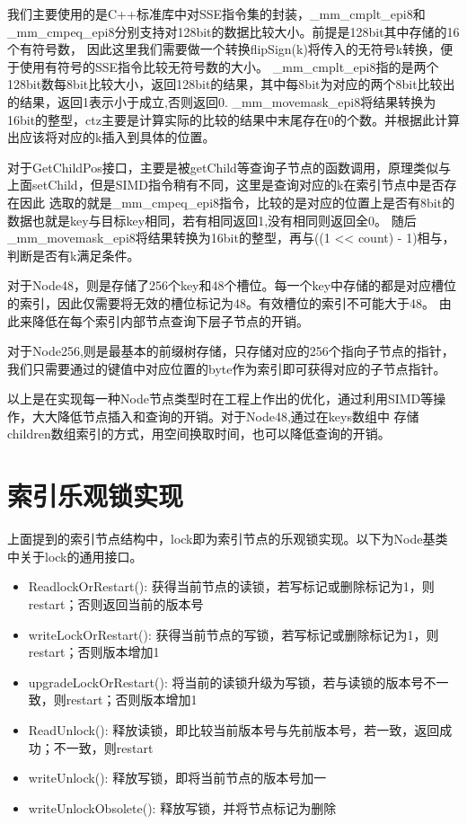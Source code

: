 我们主要使用的是C++标准库中对SSE指令集的封装，\_mm\_cmplt\_epi8和\_mm\_cmpeq\_epi8分别支持对128bit的数据比较大小。前提是128bit其中存储的16个有符号数，
因此这里我们需要做一个转换flipSign(k)将传入的无符号k转换，便于使用有符号的SSE指令比较无符号数的大小。
\_mm\_cmplt\_epi8指的是两个128bit数每8bit比较大小，返回128bit的结果，其中每8bit为对应的两个8bit比较出的结果，返回1表示小于成立,否则返回0.
\_mm\_movemask\_epi8将结果转换为16bit的整型，ctz主要是计算实际的比较的结果中末尾存在0的个数。并根据此计算出应该将对应的k插入到具体的位置。

对于GetChildPos接口，主要是被getChild等查询子节点的函数调用，原理类似与上面setChild，但是SIMD指令稍有不同，这里是查询对应的k在索引节点中是否存在因此
选取的就是\_mm\_cmpeq\_epi8指令，比较的是对应的位置上是否有8bit的数据也就是key与目标key相同，若有相同返回1,没有相同则返回全0。
随后\_mm\_movemask\_epi8将结果转换为16bit的整型，再与((1 << count) - 1)相与，判断是否有k满足条件。

对于Node48，则是存储了256个key和48个槽位。每一个key中存储的都是对应槽位的索引，因此仅需要将无效的槽位标记为48。有效槽位的索引不可能大于48。
由此来降低在每个索引内部节点查询下层子节点的开销。

对于Node256,则是最基本的前缀树存储，只存储对应的256个指向子节点的指针，我们只需要通过的键值中对应位置的byte作为索引即可获得对应的子节点指针。
 
以上是在实现每一种Node节点类型时在工程上作出的优化，通过利用SIMD等操作，大大降低节点插入和查询的开销。对于Node48,通过在keys数组中
存储children数组索引的方式，用空间换取时间，也可以降低查询的开销。
\section{索引乐观锁实现}

上面提到的索引节点结构中，lock即为索引节点的乐观锁实现。以下为Node基类中关于lock的通用接口。

\begin{itemize}

\item ReadlockOrRestart(): 获得当前节点的读锁，若写标记或删除标记为1，则restart；否则返回当前的版本号

\item writeLockOrRestart(): 获得当前节点的写锁，若写标记或删除标记为1，则restart；否则版本增加1

\item upgradeLockOrRestart(): 将当前的读锁升级为写锁，若与读锁的版本号不一致，则restart；否则版本增加1

\item ReadUnlock(): 释放读锁，即比较当前版本号与先前版本号，若一致，返回成功；不一致，则restart

\item writeUnlock(): 释放写锁，即将当前节点的版本号加一

\item writeUnlockObsolete(): 释放写锁，并将节点标记为删除

\end{itemize}

